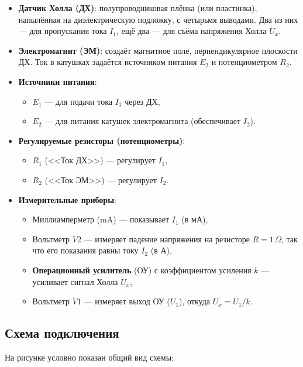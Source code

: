\documentclass[12pt,a4paper]{article}
\begin{document}
\begin{itemize}
    \item \textbf{Датчик Холла (ДХ)}: полупроводниковая плёнка (или пластинка), напылённая на диэлектрическую подложку, с четырьмя выводами. Два из них --- для пропускания тока $I_1$, ещё два --- для съёма напряжения Холла $U_x$.
    \item \textbf{Электромагнит (ЭМ)}: создаёт магнитное поле, перпендикулярное плоскости ДХ. Ток в катушках задаётся источником питания $E_2$ и потенциометром $R_2$.
    \item \textbf{Источники питания}:
          \begin{itemize}
              \item $E_1$ --- для подачи тока $I_1$ через ДХ,
              \item $E_2$ --- для питания катушек электромагнита (обеспечивает $I_2$).
          \end{itemize}
    \item \textbf{Регулируемые резисторы (потенциометры)}:
          \begin{itemize}
              \item $R_1$ (<<Ток ДХ>>) --- регулирует $I_1$,
              \item $R_2$ (<<Ток ЭМ>>) --- регулирует $I_2$.
          \end{itemize}
    \item \textbf{Измерительные приборы}:
          \begin{itemize}
              \item Миллиамперметр (mA) --- показывает $I_1$ (в мА),
              \item Вольтметр $V2$ --- измеряет падение напряжения на резисторе $R=1\,\Omega$, так что его показания равны току $I_2$ (в А),
              \item \textbf{Операционный усилитель} (ОУ) с коэффициентом усиления $k$ --- усиливает сигнал Холла $U_x$,
              \item Вольтметр $V1$ --- измеряет выход ОУ ($U_1$), откуда $U_x = U_1 / k$.
          \end{itemize}
\end{itemize}

\subsection{Схема подключения}

На рисунке условно показан общий вид схемы:
\end{document}
